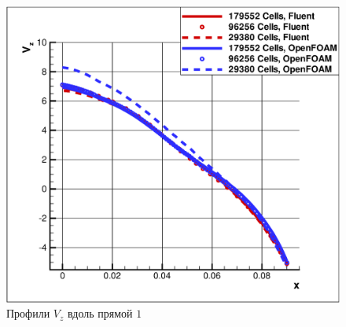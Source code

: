 \begin{figure}[h]
\begin{minipage}{0.475\linewidth}
		\includegraphics[scale=0.33]{cycloneMeshIndependence2}
		\caption{Профили $V_z$ вдоль прямой $1$}
		\label{fig:cycloneMeshIndependence2}
	\end{minipage}
\end{figure}

